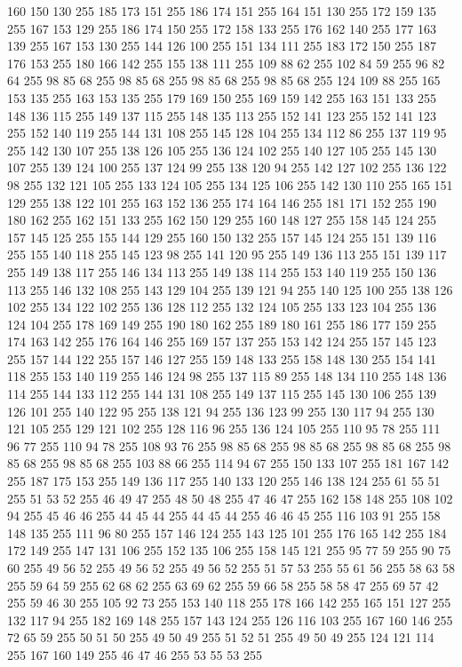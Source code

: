 160 150 130 255 185 173 151 255 186 174 151 255 164 151 130 255 172 159 135 255 167 153 129 255 186 174 150 255 172 158 133 255 176 162 140 255 177 163 139 255 167 153 130 255 144 126 100 255 151 134 111 255 183 172 150 255 187 176 153 255 180 166 142 255 155 138 111 255 109 88 62 255 102 84 59 255 96 82 64 255 98 85 68 255 98 85 68 255 98 85 68 255 98 85 68 255 124 109 88 255 165 153 135 255 163 153 135 255 179 169 150 255 169 159 142 255 163 151 133 255 148 136 115 255 149 137 115 255 148 135 113 255 152 141 123 255 152 141 123 255 152 140 119 255 144 131 108 255 145 128 104 255 134 112 86 255 137 119 95 255 142 130 107 255 138 126 105 255 136 124 102 255 140 127 105 255 145 130 107 255 139 124 100 255 137 124 99 255 138 120 94 255 142 127 102 255 136 122 98 255 132 121 105 255 133 124 105 255 134 125 106 255 142 130 110 255 165 151 129 255 138 122 101 255 163 152 136 255 174 164 146 255 181 171 152 255 190 180 162 255 162 151 133 255 162 150 129 255 160 148 127 255 158 145 124 255
157 145 125 255 155 144 129 255 160 150 132 255 157 145 124 255 151 139 116 255 155 140 118 255 145 123 98 255 141 120 95 255 149 136 113 255 151 139 117 255 149 138 117 255 146 134 113 255 149 138 114 255 153 140 119 255 150 136 113 255 146 132 108 255 143 129 104 255 139 121 94 255 140 125 100 255 138 126 102 255 134 122 102 255 136 128 112 255 132 124 105 255 133 123 104 255 136 124 104 255 178 169 149 255 190 180 162 255 189 180 161 255 186 177 159 255 174 163 142 255 176 164 146 255 169 157 137 255 153 142 124 255 157 145 123 255 157 144 122 255 157 146 127 255 159 148 133 255 158 148 130 255 154 141 118 255 153 140 119 255 146 124 98 255 137 115 89 255 148 134 110 255 148 136 114 255 144 133 112 255 144 131 108 255 149 137 115 255 145 130 106 255 139 126 101 255 140 122 95 255 138 121 94 255 136 123 99 255 130 117 94 255 130 121 105 255 129 121 102 255 128 116 96 255 136 124 105 255 110 95 78 255 111 96 77 255 110 94 78 255 108 93 76 255 98 85 68 255 98 85 68 255 98 85 68 255
98 85 68 255 98 85 68 255 103 88 66 255 114 94 67 255 150 133 107 255 181 167 142 255 187 175 153 255 149 136 117 255 140 133 120 255 146 138 124 255 61 55 51 255 51 53 52 255 46 49 47 255 48 50 48 255 47 46 47 255 162 158 148 255 108 102 94 255 45 46 46 255 44 45 44 255 44 45 44 255 46 46 45 255 116 103 91 255 158 148 135 255 111 96 80 255 157 146 124 255 143 125 101 255 176 165 142 255 184 172 149 255 147 131 106 255 152 135 106 255 158 145 121 255 95 77 59 255 90 75 60 255 49 56 52 255 49 56 52 255 49 56 52 255 51 57 53 255 55 61 56 255 58 63 58 255 59 64 59 255 62 68 62 255 63 69 62 255 59 66 58 255 58 58 47 255 69 57 42 255 59 46 30 255 105 92 73 255 153 140 118 255 178 166 142 255 165 151 127 255 132 117 94 255 182 169 148 255 157 143 124 255 126 116 103 255 167 160 146 255 72 65 59 255 50 51 50 255 49 50 49 255 51 52 51 255 49 50 49 255 124 121 114 255 167 160 149 255 46 47 46 255 53 55 53 255
